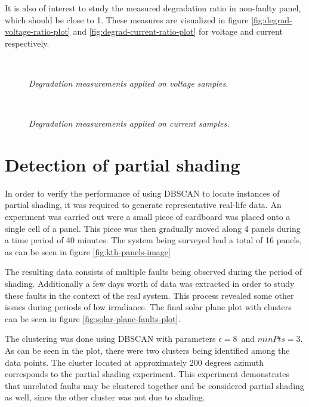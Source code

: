 It is also of interest to study the measured degradation ratio in non-faulty panel, which should be close to 1.
These measures are visualized in figure \ref{fig:degrad-voltage-ratio-plot} and \ref{fig:degrad-current-ratio-plot} for voltage and current respectively.

\begin{figure}[here]
\centering
{}
~
\caption[Performance of distance-based method (voltage)]{\emph{Degradation measurements applied on voltage samples.}}
\end{figure}

\begin{figure}[here]
\centering
{}
~
\caption[Performance of distance-based method (current)]{\emph{Degradation measurements applied on current samples.}}
\end{figure}

\clearpage
\section{Detection of partial shading}
In order to verify the performance of using DBSCAN to locate instances of partial shading, it was required to generate representative real-life data.
An experiment was carried out were a small piece of cardboard was placed onto a single cell of a panel.
This piece was then gradually moved along 4 panels during a time period of 40 minutes.
The system being surveyed had a total of 16 panels, as can be seen in figure \ref{fig:kth-panels-image}

The resulting data consists of multiple faults being observed during the period of shading.
Additionally a few days worth of data was extracted in order to study these faults in the context of the real system.
This process revealed some other issues during periods of low irradiance.
The final solar plane plot with clusters can be seen in figure \ref{fig:solar-plane-faults-plot}.

The clustering was done using DBSCAN with parameters $\epsilon = 8$ and $minPts = 3$.
As can be seen in the plot, there were two clusters being identified among the data points.
The cluster located at approximately 200 degrees azimuth corresponds to the partial shading experiment.
This experiment demonstrates that unrelated faults may be clustered together and be considered partial shading as well, since the other cluster was not due to shading.


